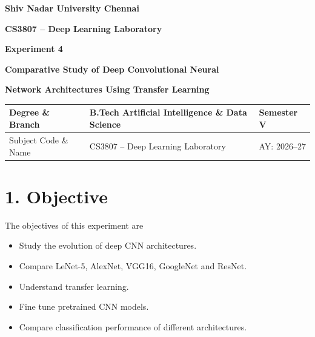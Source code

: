 \documentclass[11pt]{article}
\begin{document}

\begin{center}

{\Large\textbf{Shiv Nadar University Chennai}}

\vspace{3mm}

{\large\textbf{CS3807 -- Deep Learning Laboratory}}

\vspace{3mm}

{\Large\textbf{Experiment 4}}

\vspace{2mm}

{\Large\textbf{Comparative Study of Deep Convolutional Neural}}

{\Large\textbf{Network Architectures Using Transfer Learning}}

\end{center}

\vspace{5mm}

\begin{tabular}{|p{4cm}|p{8cm}|p{2cm}|}
\hline
Degree \& Branch &
B.Tech Artificial Intelligence \& Data Science &
Semester V\\
\hline
Subject Code \& Name &
CS3807 -- Deep Learning Laboratory &
AY: 2026--27\\
\hline
\end{tabular}


\section*{1. Objective}

The objectives of this experiment are

\begin{itemize}

\item Study the evolution of deep CNN architectures.

\item Compare LeNet-5, AlexNet, VGG16, GoogleNet and ResNet.

\item Understand transfer learning.

\item Fine tune pretrained CNN models.

\item Compare classification performance of different architectures.

\end{itemize}
\end{document}
